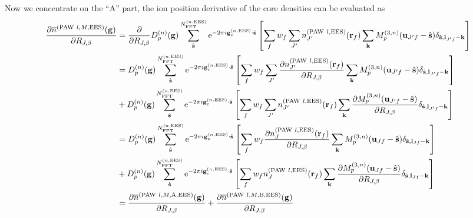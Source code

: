 \documentclass[paper=a4, fontsize=11pt]{article} %
\numberwithin{equation}{section} %
\numberwithin{figure}{section} %
\numberwithin{table}{section} %
\newcommand{\p}{\partial}
\newcommand{\ol}{\overline}
\newcommand{\bu}{{\bf{u}}}
\newcommand{\bl}{{\bf{l}}}
\newcommand{\bk}{{\bf{k}}}
\newcommand{\bs}{{\bf{s}}}
\newcommand{\bg}{{\bf{g}}}
\newcommand{\br}{{\bf{r}}}
\newcommand{\rEES}{{\mathrm{EES}}}
\newcommand{\re}{{\mathrm{e}}}
\newcommand{\rP}{{\mathrm{PAW}}}
\newcommand{\rA}{{\mathrm{A}}}
\newcommand{\rB}{{\mathrm{B}}}
\newcommand{\gcnEES}{{\bg_c^{(n,\rEES)}}}
\newcommand{\RJb}{{R_{J,\beta}}}
\newcommand{\NFFTnEES}{{N^{(n,\rEES)}_{\mathrm{FFT}}}}
\newcommand{\Mn}{{M_p^{(3,n)}}}
\begin{document}
Now we concentrate on the ``$\rA$'' part, the ion position derivative of the core densities can be evaluated as
\begin{equation}
\begin{split}
\frac{\p \ol n^{(\rP\ l,M,\rEES)}(\bg)}{\p \RJb}
&= \frac{\p }{\p \RJb} D_p^{(n)}(\bg)\sum_{\hat \bs}^{\NFFTnEES} \re^{-2\pi i\gcnEES \cdot \hat\bs}\left[\sum_f w_f \sum_{J'} n_{J'}^{(\rP\ l,\rEES)}(\br_f) \sum_{\bk}  \Mn(\bu_{J'f}-\hat \bs)\delta_{\hat \bs,\bl_{J'f}-\bk}\right] \\
&= D_p^{(n)}(\bg)\sum_{\hat \bs}^{\NFFTnEES} \re^{-2\pi i\gcnEES \cdot \hat\bs}\left[\sum_f w_f \sum_{J'} \frac{\p n_{J'}^{(\rP\ l,\rEES)}(\br_f)}{\p \RJb} \sum_{\bk}  \Mn(\bu_{J'f}-\hat \bs)\delta_{\hat \bs,\bl_{J'f}-\bk}\right] \\
&+ D_p^{(n)}(\bg)\sum_{\hat \bs}^{\NFFTnEES} \re^{-2\pi i\gcnEES \cdot \hat\bs}\left[\sum_f w_f \sum_{J'} n_{J'}^{(\rP\ l,\rEES)}(\br_f) \sum_{\bk}  \frac{\p \Mn(\bu_{J'f}-\hat \bs)}{\p \RJb}\delta_{\hat \bs,\bl_{J'f}-\bk}\right]\\
&= D_p^{(n)}(\bg)\sum_{\hat \bs}^{\NFFTnEES} \re^{-2\pi i\gcnEES \cdot \hat\bs}\left[\sum_f w_f \frac{\p n_{J}^{(\rP\ l,\rEES)}(\br_f)}{\p \RJb} \sum_{\bk}  \Mn(\bu_{Jf}-\hat \bs)\delta_{\hat \bs,\bl_{Jf}-\bk}\right] \\
&+ D_p^{(n)}(\bg)\sum_{\hat \bs}^{\NFFTnEES} \re^{-2\pi i\gcnEES \cdot \hat\bs}\left[\sum_f w_f n_{J}^{(\rP\ l,\rEES)}(\br_f) \sum_{\bk}  \frac{\p \Mn(\bu_{Jf}-\hat \bs)}{\p \RJb}\delta_{\hat \bs,\bl_{Jf}-\bk}\right]\\
&= \frac{\p \ol n^{(\rP\ l,M,\rA,\rEES)}(\bg)}{\p \RJb}
+\frac{\p \ol n^{(\rP\ l,M,\rB,\rEES)}(\bg)}{\p \RJb}
\end{split}
\end{equation}
\end{document}
